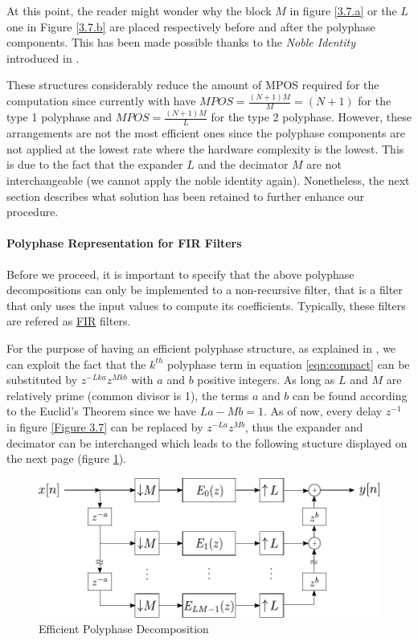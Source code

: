 At this point, the reader might wonder why the block $M$ in figure \ref{3.7.a} or the $L$ one in Figure \ref{3.7.b} are placed respectively before and after the polyphase components. This has been made possible thanks to the \textit{Noble Identity} introduced in \cite[p.~204-205]{Oppenheim}.

These structures considerably reduce the amount of MPOS required for the computation since currently with have $MPOS = \frac{(N+1)M}{M} = (N+1)$ for the type 1 polyphase and $MPOS = \frac{(N+1)M}{L} $ for the type 2 polyphase. However, these arrangements are not the most efficient ones since the polyphase components are not applied at the lowest rate where the hardware complexity is the lowest. This is due to the fact that the expander $L$ and the decimator $M$ are not interchangeable (we cannot apply the noble identity again). Nonetheless, the next section describes what solution has been retained to further enhance our procedure.

\paragraph{Polyphase Representation for FIR Filters}
\justify

Before we proceed, it is important to specify that the above polyphase decompositions can only be implemented to a non-recursive filter, that is a filter that only uses the input values to compute its coefficients. Typically, these filters are refered as \hyperlink{FIR}{FIR} filters. 

For the purpose of having an efficient polyphase structure, as explained in \cite{vaidyanathan}, we can exploit the fact that the  $k^{th}$ polyphase term in equation \ref{eqn:compact} can be substituted by $z^{-Lka}z^{Mkb}$ with $a$ and $b$ positive integers. As long as $L$ and $M$ are relatively prime (common divisor is 1), the terms $a$ and $b$ can be found according to the Euclid's Theorem since we have $La-Mb=1$. As of now, every delay $z^{-1}$ in figure \ref{Figure 3.7} can be replaced by $z^{-La}z^{Mb}$, thus the expander and decimator can be interchanged which leads to the following stucture displayed on the next page (figure \ref{Figure 3.8}).

\begin{figure}[ht!]
	\centering
	\includegraphics[scale=1]{polyphase_direct_efficient.pdf}
	\vspace*{1mm}
	\caption{Efficient Polyphase Decomposition}
	\label{Figure 3.8}
\end{figure}




